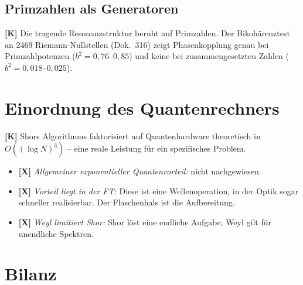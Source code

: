 \subsection{Primzahlen als Generatoren}

\textbf{[K]} Die tragende Resonanzstruktur beruht auf Primzahlen. Der
Bikohärenztest an 2469 Riemann-Nullstellen (Dok.~316) zeigt
Phasenkopplung genau bei Primzahlpotenzen ($b^2 = 0{,}76$--$0{,}85$)
und keine bei zusammengesetzten Zahlen ($b^2 = 0{,}018$--$0{,}025$).

\section{Einordnung des Quantenrechners}

\textbf{[K]} Shors Algorithmus faktorisiert auf Quantenhardware
theoretisch in $O((\log N)^3)$ -- eine reale Leistung für ein
spezifisches Problem.

\begin{itemize}
  \item \textbf{[X]} \emph{Allgemeiner exponentieller Quantenvorteil:}
    nicht nachgewiesen.
  \item \textbf{[X]} \emph{Vorteil liegt in der FT:} Diese ist eine
    Wellenoperation, in der Optik sogar schneller realisierbar. Der
    Flaschenhals ist die Aufbereitung.
  \item \textbf{[X]} \emph{Weyl limitiert Shor:} Shor löst eine
    endliche Aufgabe; Weyl gilt für unendliche Spektren.
\end{itemize}

\section{Bilanz}

